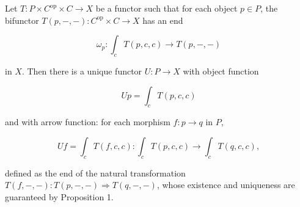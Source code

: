 Let $T: P \times C^{\mathrm{op}} \times C \to X$ be a functor such that for each object $p \in P$, the bifunctor $T(p, -, -): C^{\mathrm{op}} \times C \to X$ has an end

$$\omega_{p}: \int_c T(p, c, c) \to T(p, -, -)$$

in $X$. Then there is a unique functor $U: P \to X$ with object function

$$Up = \int_c T(p, c, c)$$

and with arrow function: for each morphism $f: p \to q$ in $P$,

$$Uf = \int_c T(f, c, c): \int_c T(p, c, c) \to \int_c T(q, c, c),$$

defined as the end of the natural transformation $T(f, -, -): T(p, -, -) \Rightarrow T(q, -, -)$, whose existence and uniqueness are guaranteed by Proposition 1.
